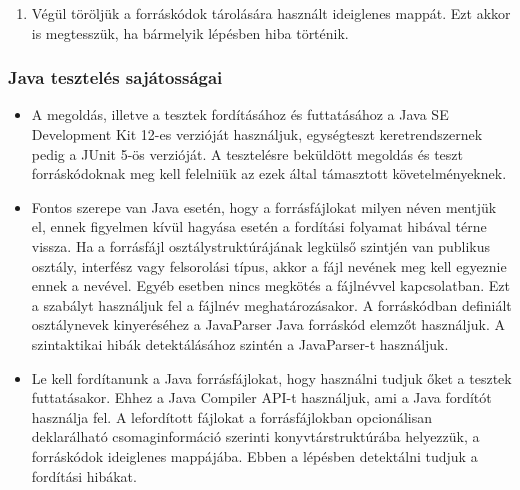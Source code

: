 \documentclass{elteikthesis}
\begin{document}
\begin{enumerate}
						\begin{verbatim}
							[
								{ "name": "first test", "status": "pass" },
								{ "name": "second test", "status": "fail" },
								...
							]
						\end{verbatim}
						\item Végül töröljük a forráskódok tárolására használt ideiglenes mappát. Ezt akkor is megtesszük, ha bármelyik lépésben hiba történik.
					\end{enumerate}

				\subsubsection{Java tesztelés sajátosságai}
					\begin{itemize}
						\item A megoldás, illetve a tesztek fordításához és futtatásához a Java SE Development Kit 12-es verzióját használjuk, egységteszt keretrendszernek pedig a JUnit 5-ös verzióját. A tesztelésre beküldött megoldás és teszt forráskódoknak meg kell felelniük az ezek által támasztott követelményeknek.
						\item Fontos szerepe van Java esetén, hogy a forrásfájlokat milyen néven mentjük el, ennek figyelmen kívül hagyása esetén a fordítási folyamat hibával térne vissza. Ha a forrásfájl osztálystruktúrájának legkülső szintjén van publikus osztály, interfész vagy felsorolási típus, akkor a fájl nevének meg kell egyeznie ennek a nevével. Egyéb esetben nincs megkötés a fájlnévvel kapcsolatban. Ezt a szabályt használjuk fel a fájlnév meghatározásakor. A forráskódban definiált osztálynevek kinyeréséhez a JavaParser Java forráskód elemzőt használjuk. A szintaktikai hibák detektálásához szintén a JavaParser-t használjuk.
						\item Le kell fordítanunk a Java forrásfájlokat, hogy használni tudjuk őket a tesztek futtatásakor. Ehhez a Java Compiler API-t használjuk, ami a Java fordítót használja fel. A lefordított fájlokat a forrásfájlokban opcionálisan deklarálható csomaginformáció szerinti konyvtárstruktúrába helyezzük, a forráskódok ideiglenes mappájába. Ebben a lépésben detektálni tudjuk a fordítási hibákat.

\end{itemize}
\end{document}
